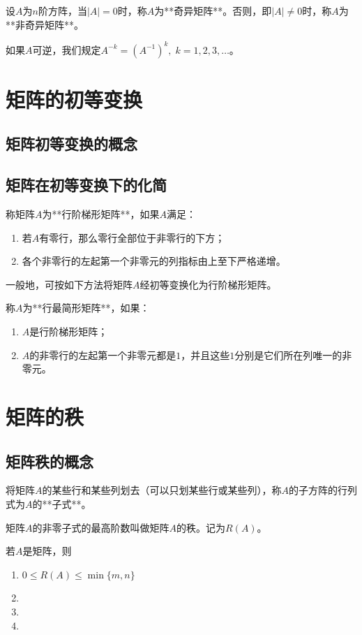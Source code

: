 设$A$为$n$阶方阵，当$|A|=0$时，称$A$为**奇异矩阵**。否则，即$|A|\neq0$时，称$A$为**非奇异矩阵**。

如果$A$可逆，我们规定$A^{-k}=(A^{-1})^k,\;k=1,2,3,\dots$。


\section{矩阵的初等变换}

\subsection{矩阵初等变换的概念}
\subsection{矩阵在初等变换下的化简}
称矩阵$A$为**行阶梯形矩阵**，如果$A$满足：
\begin{enumerate}
    \item 若$A$有零行，那么零行全部位于非零行的下方；
    \item 各个非零行的左起第一个非零元的列指标由上至下严格递增。
\end{enumerate}

一般地，可按如下方法将矩阵$A$经初等变换化为行阶梯形矩阵。

称$A$为**行最简形矩阵**，如果：
\begin{enumerate}
    \item $A$是行阶梯形矩阵；
    \item $A$的非零行的左起第一个非零元都是$1$，并且这些$1$分别是它们所在列唯一的非零元。
\end{enumerate}


\section{矩阵的秩}

\subsection{矩阵秩的概念}
将矩阵$A$的某些行和某些列划去（可以只划某些行或某些列），称$A$的子方阵的行列式为$A$的**子式**。

\begin{definition}
矩阵$A$的非零子式的最高阶数叫做矩阵$A$的秩。记为$R(A)$。
\end{definition}

若$A$是矩阵，则
\begin{enumerate}
    \item $0\le R(A)\le \min\{m,n\}$
    \item %
    \item %
    \item %
\end{enumerate}

